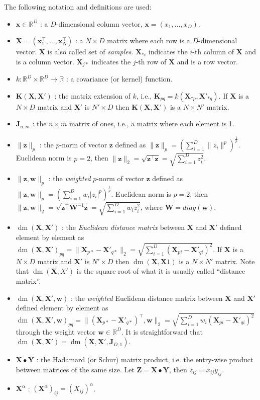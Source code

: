 \documentclass[a4paper,11pt]{article}
\newcommand\R{{\mathbb R}}
\newcommand\x{{\mathbf x}}
\newcommand\X{{\mathbf X}}
\newcommand\K{{\mathbf K}}
\newcommand\J{{\mathbf J}}
\DeclareMathOperator*{\dm}{dm}
\begin{document}
The following notation and definitions are used:
\begin{itemize}
\item $\x \in \R^D$ : a $D$-dimensional column vector, $\x =
  (x_1,\ldots,x_D)$.
\item $\X = (\x_1^{\top},\ldots,\x_N^{\top})$ : a $N \times D$ matrix
  where each row is a $D$-dimensional vector. $\X$ is also called set
  of \emph{samples}. $\X_{* i}$ indicates the $i$-th column of $\X$
  and is a column vector. $\X_{j *}$ indicates the $j$-th row of $\X$
  and is a row vector.
\item $k: \R^D \times \R^D \rightarrow \R$ : a covariance (or kernel)
  function.
\item $\K(\X,\X')$ : the matrix extension of $k$, i.e., $\K_{pq} =
  k(\X_{*p},\X'_{*q})$. If $\X$ is a $N \times D$ matrix and $\X'$ is
  $N' \times D$ then $\K(\X,\X')$ is a $N \times N'$ matrix.
\item $\J_{n,m}$ : the $n \times m$ matrix of ones, i.e., a matrix
  where each element is 1.
\item $\|\mathbf{z}\|_p$ : the $p$-norm of vector $\mathbf{z}$ defined
  as $\|\mathbf{z}\|_p = (\sum_{i=1}^D \|z_i\|^p)^{\frac{1}{p}}$.
  Euclidean norm is $p=2$, then $\|\mathbf{z}\|_2 =
  \sqrt{\mathbf{z}^{\top}\mathbf{z}} = \sqrt{\sum_{i=1}^D z_i^2}$.
\item $\|\mathbf{z},\mathbf{w}\|_p$ : the \emph{weighted} $p$-norm of
  vector $\mathbf{z}$ defined as $\|\mathbf{z},\mathbf{w}\|_p =
  (\sum_{i=1}^D w_i|z_i|^p)^{\frac{1}{p}}$.  Euclidean norm is
  $p=2$, then $\|\mathbf{z},\mathbf{w}\|_2 = \sqrt{\mathbf{z}^{\top}
    \mathbf{W}^{-1} \mathbf{z}} = \sqrt{\sum_{i=1}^D w_i z_i^2}$,
  where $\mathbf{W} = diag(\mathbf{w})$.
\item $\dm(\X,\X')$ : the \emph{Euclidean distance matrix} between
  $\X$ and $\X'$ defined element by element as $\dm(\X,\X')_{pq} =
  \|\X_{p *} - \X'_{q *}\|_2 = \sqrt{\sum_{i=1}^D (\X_{p i} - \X'_{q
      i})^2}$. If $\X$ is a $N \times D$ matrix and $\X'$ is $N'
  \times D$ then $\dm(\X,\X1)$ is a $N \times N'$ matrix. Note that
  $\dm(\X,X')$ is the square root of what it is usually called
  ``distance matrix''.
\item $\dm(\X,\X',\mathbf{w})$ : the \emph{weighted} Euclidean
  distance matrix between $\X$ and $\X'$ defined element by element as
  $\dm(\X,\X',\mathbf{w})_{pq} = \|(\X_{p *} - \X'_{q *})^{\top},
  \mathbf{w}\|_2 = \sqrt{\sum_{i=1}^D w_i(\X_{p i} - \X'_{q i})^2}$
  through the weight vector $\mathbf{w} \in \R^D$. It is
  straightforward that $\dm(\X,\X') = \dm(\X,\X',\mathbf{J}_{D,1})$.
\item $\X \bullet \mathbf{Y}$ : the Hadamard (or Schur) matrix
  product, i.e. the entry-wise product between matrices of the same
  size. Let $\mathbf{Z} = \X \bullet \mathbf{Y}$, then $z_{ij} =
  x_{ij} y_{ij}$.
\item $\X^{\alpha}$ : $(\X^{\alpha})_{ij} = (X_{ij})^{\alpha}$.
\end{itemize}
\end{document}
